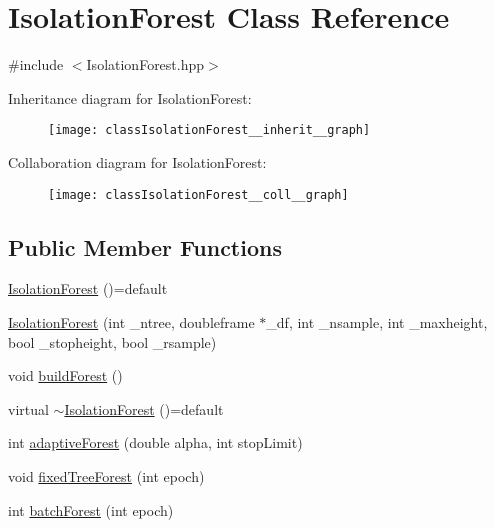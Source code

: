 \hypertarget{classIsolationForest}{}\section{Isolation\+Forest Class Reference}
\label{classIsolationForest}


{\ttfamily \#include $<$Isolation\+Forest.\+hpp$>$}



Inheritance diagram for Isolation\+Forest\+:\nopagebreak
\begin{figure}[H]
\begin{center}
\leavevmode
\texttt{[image: classIsolationForest\_\_inherit\_\_graph]}
\end{center}
\end{figure}


Collaboration diagram for Isolation\+Forest\+:\nopagebreak
\begin{figure}[H]
\begin{center}
\leavevmode
\texttt{[image: classIsolationForest\_\_coll\_\_graph]}
\end{center}
\end{figure}
\subsection*{Public Member Functions}
\begin{DoxyCompactItemize}
\item 
\hyperlink{classIsolationForest_a381db4db6b4c0b3e532f67398b50e32a}{Isolation\+Forest} ()=default
\item 
\hyperlink{classIsolationForest_aa81cd568d5db199124cf381615cece42}{Isolation\+Forest} (int \+\_\+ntree, doubleframe $\ast$\+\_\+df, int \+\_\+nsample, int \+\_\+maxheight, bool \+\_\+stopheight, bool \+\_\+rsample)
\item 
void \hyperlink{classIsolationForest_a82005a7421ba74d37f7b5d24949c9e91}{build\+Forest} ()
\item 
virtual \hyperlink{classIsolationForest_add206f655ddfa46c359ae72ce4b5c66c}{$\sim$\+Isolation\+Forest} ()=default
\item 
int \hyperlink{classIsolationForest_a33dae487524bd1fdaf085a36dab04ee9}{adaptive\+Forest} (double alpha, int stop\+Limit)
\item 
void \hyperlink{classIsolationForest_a252267bf58f8bb812c4dca47d5390709}{fixed\+Tree\+Forest} (int epoch)
\item 
int \hyperlink{classIsolationForest_a10ab0476940aab9d6aa877d002fa9d5d}{batch\+Forest} (int epoch)
\end{DoxyCompactItemize}
